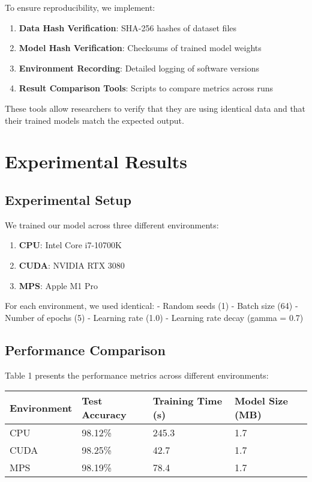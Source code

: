 \documentclass[
]{article}
\providecommand{\tightlist}{%
  \setlength{\itemsep}{0pt}\setlength{\parskip}{0pt}}\usepackage{longtable,booktabs,array}
\begin{document}
To ensure reproducibility, we implement:

\begin{enumerate}
\def\labelenumi{\arabic{enumi}.}
\tightlist
\item
  \textbf{Data Hash Verification}: SHA-256 hashes of dataset files
\item
  \textbf{Model Hash Verification}: Checksums of trained model weights
\item
  \textbf{Environment Recording}: Detailed logging of software versions
\item
  \textbf{Result Comparison Tools}: Scripts to compare metrics across
  runs
\end{enumerate}

These tools allow researchers to verify that they are using identical
data and that their trained models match the expected output.

\section{Experimental Results}\label{sec-results}

\subsection{Experimental Setup}\label{experimental-setup}

We trained our model across three different environments:

\begin{enumerate}
\def\labelenumi{\arabic{enumi}.}
\tightlist
\item
  \textbf{CPU}: Intel Core i7-10700K
\item
  \textbf{CUDA}: NVIDIA RTX 3080
\item
  \textbf{MPS}: Apple M1 Pro
\end{enumerate}

For each environment, we used identical: - Random seeds (1) - Batch size
(64) - Number of epochs (5) - Learning rate (1.0) - Learning rate decay
(gamma = 0.7)

\subsection{Performance Comparison}\label{performance-comparison}

Table 1 presents the performance metrics across different environments:

\begin{longtable}[]{@{}llll@{}}
\toprule\noalign{}
Environment & Test Accuracy & Training Time (s) & Model Size (MB) \\
\midrule\noalign{}
\endhead
\bottomrule\noalign{}
\endlastfoot
CPU & 98.12\% & 245.3 & 1.7 \\
CUDA & 98.25\% & 42.7 & 1.7 \\
MPS & 98.19\% & 78.4 & 1.7 \\
\end{longtable}
\end{document}
